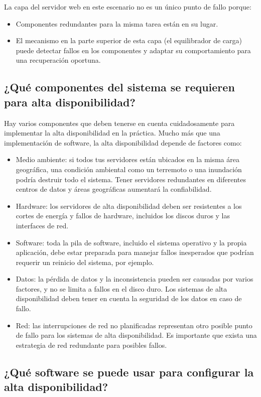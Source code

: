 \documentclass{article}
\begin{document}
\begin{multicols}{2}
La capa del servidor web en este escenario no es un único punto de fallo porque:

\begin{itemize}
\item Componentes redundantes para la misma tarea están en su lugar.
\item El mecanismo en la parte superior de esta capa (el equilibrador de carga) puede detectar fallos en los componentes y adaptar su comportamiento para una recuperación oportuna.
\end{itemize}

\subsection{¿Qué componentes del sistema se requieren para alta disponibilidad?}
Hay varios componentes que deben tenerse en cuenta cuidadosamente para implementar la alta disponibilidad en la práctica.
Mucho más que una implementación de software, la alta disponibilidad depende de factores como:

\begin{itemize}
\item Medio ambiente: si todos tus servidores están ubicados en la misma área geográfica, una condición ambiental como un terremoto o una inundación podría destruir todo el sistema. Tener servidores redundantes en diferentes centros de datos y áreas geográficas aumentará la confiabilidad.
\item Hardware: los servidores de alta disponibilidad deben ser resistentes a los cortes de energía y fallos de hardware, incluidos los discos duros y las interfaces de red.
\item Software: toda la pila de software, incluido el sistema operativo y la propia aplicación, debe estar preparada para manejar fallos inesperados que podrían requerir un reinicio del sistema, por ejemplo.
\item Datos: la pérdida de datos y la inconsistencia pueden ser causadas por varios factores, y no se limita a fallos en el disco duro. Los sistemas de alta disponibilidad deben tener en cuenta la seguridad de los datos en caso de fallo.
\item Red: las interrupciones de red no planificadas representan otro posible punto de fallo para los sistemas de alta disponibilidad. Es importante que exista una estrategia de red redundante para posibles fallos.
\end{itemize}

\subsection{¿Qué software se puede usar para configurar la alta disponibilidad?}


\end{multicols}
\end{document}
